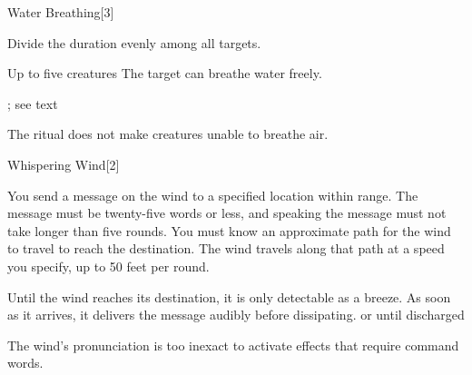 \begin{spellsection}{Water Breathing}[3]
    \begin{spellheader}
    \end{spellheader}
    \begin{spellcontent}
        \begin{spelltargetinginfo}
        \end{spelltargetinginfo}
        \begin{spelleffects}

            \spellspecial Divide the duration evenly among all targets.
            \begin{spelltargets}{Up to five creatures}
                \spelleffect The target can breathe water freely. 
            \end{spelltargets}
            \spelldur \durext \dismissable; see text
        \end{spelleffects}
    \end{spellcontent}
    \begin{spellfooter}
        \spellnotes The ritual does not make creatures unable to breathe air.
    \end{spellfooter}
\end{spellsection}

\begin{spellsection}{Whispering Wind}[2]
    \begin{spellheader}
    \end{spellheader}
    \begin{spellcontent}
        \begin{spelltargetinginfo}
        \end{spelltargetinginfo}
        \begin{spelleffects}

            \spelleffect You send a message on the wind to a specified location within range. The message must be twenty-five words or less, and speaking the message must not take longer than five rounds. You must know an approximate path for the wind to travel to reach the destination. The wind travels along that path at a speed you specify, up to 50 feet per round.

            Until the wind reaches its destination, it is only detectable as a breeze. As soon as it arrives, it delivers the message audibly before dissipating.
            \spelldur \durext or until discharged
        \end{spelleffects}
    \end{spellcontent}
    \begin{spellfooter}
        \spellnotes The wind's pronunciation is too inexact to activate effects that require command words.
    \end{spellfooter}
\end{spellsection}

